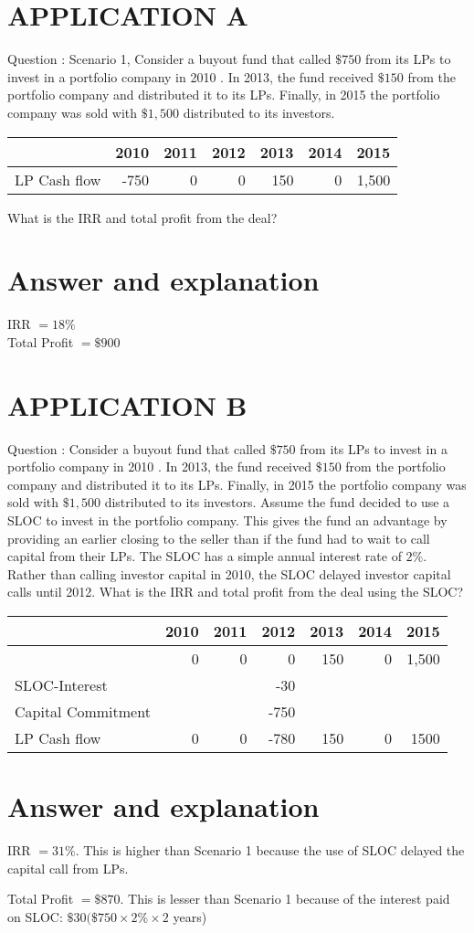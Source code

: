 \documentclass[11pt]{article}
\begin{document}
\section*{APPLICATION A}
Question : Scenario 1, Consider a buyout fund that called $\$ 750$ from its LPs to invest in a portfolio company in 2010 . In 2013, the fund received $\$ 150$ from the portfolio company and distributed it to its LPs. Finally, in 2015 the portfolio company was sold with $\$ 1,500$ distributed to its investors.

\begin{center}
\begin{tabular}{|r|r|r|r|r|r|r|}
\hline
 & 2010 & 2011 & 2012 & 2013 & 2014 & 2015 \\
\hline
LP Cash flow & -750 & 0 & 0 & 150 & 0 & 1,500 \\
\hline
\end{tabular}
\end{center}

What is the IRR and total profit from the deal?

\section*{Answer and explanation}
IRR $=18 \%$\\
Total Profit $=\$ 900$

\section*{APPLICATION B}
Question :  Consider a buyout fund that called $\$ 750$ from its LPs to invest in a portfolio company in 2010 . In 2013, the fund received $\$ 150$ from the portfolio company and distributed it to its LPs. Finally, in 2015 the portfolio company was sold with $\$ 1,500$ distributed to its investors. Assume the fund decided to use a SLOC to invest in the portfolio company. This gives the fund an advantage by providing an earlier closing to the seller than if the fund had to wait to call capital from their LPs. The SLOC has a simple annual interest rate of $2 \%$. Rather than calling investor capital in 2010, the SLOC delayed investor capital calls until 2012. What is the IRR and total profit from the deal using the SLOC?

\begin{center}
\begin{tabular}{|l|r|r|r|r|r|r|}
\hline
 & 2010 & 2011 & 2012 & 2013 & 2014 & 2015 \\
\hline
 & 0 & 0 & 0 & 150 & 0 & 1,500 \\
\hline
SLOC-Interest &  &  & -30 &  &  &  \\
\hline
Capital Commitment &  &  & -750 &  &  &  \\
\hline
LP Cash flow & 0 & 0 & -780 & 150 & 0 & 1500 \\
\hline
\end{tabular}
\end{center}

\section*{Answer and explanation}
IRR $=31 \%$. This is higher than Scenario 1 because the use of SLOC delayed the capital call from LPs.

Total Profit $=\$ 870$. This is lesser than Scenario 1 because of the interest paid on SLOC: $\$ 30(\$ 750 \times 2 \% \times 2$ years)
\end{document}
